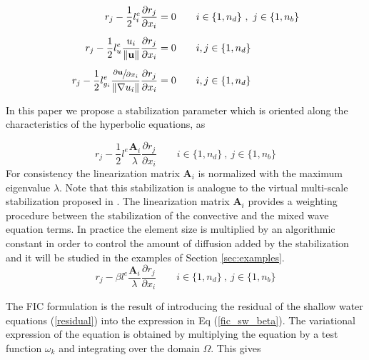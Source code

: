 \documentclass[a4paper,12pt]{article}
\newcommand{\pder}[2]{\frac{\partial#1}{\partial#2}}
\newcommand{\norm}[1]{\lVert#1\rVert}
\begin{document}
\begin{subequations}
\begin{align}
r_j - \frac{1}{2}l^e_i\pder{r_j}{x_i} &= 0
    \qquad i\in\{1,n_d\} \ ,\ j\in\{1,n_b\}\\[5pt]
r_j - \frac{1}{2}l^e_u\frac{u_i}{\norm{\mathbf{u}}}\pder{r_j}{x_i} &= 0
    \qquad i,j\in\{1,n_d\}\\[5pt]
r_j - \frac{1}{2}l^e_{g_i}\frac{\sfrac{\partial\mathbf{u}}{\partial x_i}}{\norm{\nabla u_i}}\pder{r_j}{x_i} &= 0
    \qquad i,j\in\{1,n_d\}
\end{align}
\end{subequations}

In this paper we propose a stabilization parameter which is oriented along the characteristics of the hyperbolic equations, as

\begin{equation} \label{fic_sw}
r_j - \frac{1}{2}l^e\frac{\mathbf{A}_i}{\lambda}\pder{r_j}{x_i}
    \qquad i\in\{1,n_d\} \ ,\ j\in\{1,n_b\}
\end{equation}
For consistency the linearization matrix $\mathbf{A}_i$ is normalized with the maximum eigenvalue $\lambda$. Note that this stabilization is analogue to the virtual multi-scale stabilization proposed in \cite{codina2008b}. The linearization matrix $\mathbf{A}_i$ provides a weighting procedure between the stabilization of the convective and the mixed wave equation terms. In practice the element size is multiplied by an algorithmic constant in order to control the amount of diffusion added by the stabilization and it will be studied in the examples of Section \ref{sec:examples}.
\begin{equation} \label{fic_sw_beta}
r_j - \beta l^e\frac{\mathbf{A}_i}{\lambda}\pder{r_j}{x_i}
    \qquad i\in\{1,n_d\} \ ,\ j\in\{1,n_b\}
\end{equation}

The FIC formulation is the result of introducing the residual of the shallow water equations (\ref{residual}) into the expression in Eq (\ref{fic_sw_beta}). The variational expression of the equation is obtained by multiplying the equation by a test function $\omega_k$ and integrating over the domain $\Omega$. This gives
\end{document}
